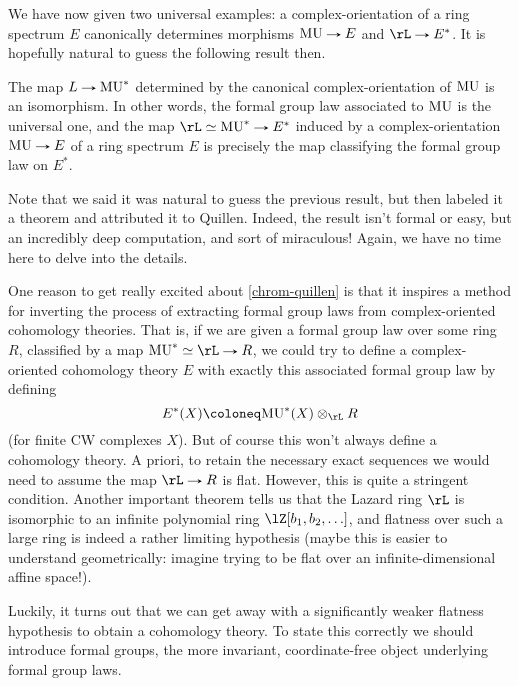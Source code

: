 We have now given two universal examples: a complex-orientation of a
ring spectrum $E$ canonically determines morphisms $\MU \to E$ and
$\rL \to E^*$. It is hopefully natural to guess the following result
then.

\begin{theorem}[Quillen]
  \label{chrom-quillen}
  The map $L \to \MU^*$ determined by the canonical
  complex-orientation of $\mathrm{MU}$ is an isomorphism. In other words, the
  formal group law associated to $\mathrm{MU}$ is the universal one, and the
  map $\rL \iso \MU^* \to E^*$ induced by a complex-orientation
  $\MU \to E$ of a ring spectrum $E$ is precisely the map classifying
  the formal group law on $E^*$.
\end{theorem}

\begin{remark}
  \label{chrom-quillenhard}
  Note that we said it was natural to guess the previous result, but
  then labeled it a theorem and attributed it to Quillen. Indeed, the
  result isn't formal or easy, but an incredibly deep computation, and
  sort of miraculous!  Again, we have no time here to delve into the
  details.
\end{remark}

One reason to get really excited about \cref{chrom-quillen} is that it
inspires a method for inverting the process of extracting formal group
laws from complex-oriented cohomology theories. That is, if we are
given a formal group law over some ring $R$, classified by a map
$\MU^* \iso \rL \to R$, we could try to define a complex-oriented
cohomology theory $E$ with exactly this associated formal group law by
defining
\[
E^*(X) \ce \MU^*(X) \otimes_\rL R
\]
(for finite CW complexes $X$). But of course this won't always define
a cohomology theory. A priori, to retain the necessary exact sequences
we would need to assume the map $\rL \to R$ is flat. However, this is
quite a stringent condition. Another important theorem tells us that
the Lazard ring $\rL$ is isomorphic to an infinite polynomial ring
$\lZ[b_1,b_2,\ldots]$, and flatness over such a large ring is indeed a
rather limiting hypothesis (maybe this is easier to understand
geometrically: imagine trying to be flat over an infinite-dimensional
affine space!).

Luckily, it turns out that we can get away with a significantly weaker
flatness hypothesis to obtain a cohomology theory. To state this
correctly we should introduce formal groups, the more invariant,
coordinate-free object underlying formal group laws.

